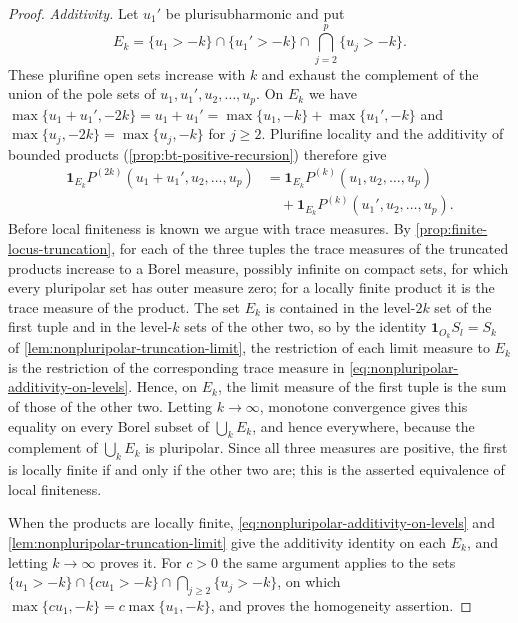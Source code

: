 \begin{proof}
\emph{Additivity.} Let $u_1'$ be plurisubharmonic and put
\[
 E_k=\{u_1>-k\}\cap\{u_1'>-k\}
                    \cap\bigcap_{j=2}^p\{u_j>-k\}.
\]
These plurifine open sets increase with $k$ and exhaust the complement of the union of the pole sets of $u_1,u_1',u_2,\ldots,u_p$. On $E_k$ we have $\max\{u_1+u_1',-2k\}=u_1+u_1'=\max\{u_1,-k\}+\max\{u_1',-k\}$ and $\max\{u_j,-2k\}=\max\{u_j,-k\}$ for $j\geq2$. Plurifine locality and the additivity of bounded products (\cref{prop:bt-positive-recursion}) therefore give
\begin{equation}\label{eq:nonpluripolar-additivity-on-levels}
 \begin{aligned}
 \mathbf1_{E_k}P^{(2k)}(u_1+u_1',u_2,\ldots,u_p)
 &=\mathbf1_{E_k}P^{(k)}(u_1,u_2,\ldots,u_p)\\
 &\quad+\mathbf1_{E_k}P^{(k)}(u_1',u_2,\ldots,u_p).
 \end{aligned}
\end{equation}
Before local finiteness is known we argue with trace measures. By \cref{prop:finite-locus-truncation}, for each of the three tuples the trace measures of the truncated products increase to a Borel measure, possibly infinite on compact sets, for which every pluripolar set has outer measure zero; for a locally finite product it is the trace measure of the product. The set $E_k$ is contained in the level-$2k$ set of the first tuple and in the level-$k$ sets of the other two, so by the identity $\mathbf1_{O_k}S_l=S_k$ of \cref{lem:nonpluripolar-truncation-limit}, the restriction of each limit measure to $E_k$ is the restriction of the corresponding trace measure in \eqref{eq:nonpluripolar-additivity-on-levels}. Hence, on $E_k$, the limit measure of the first tuple is the sum of those of the other two. Letting $k\to\infty$, monotone convergence gives this equality on every Borel subset of $\bigcup_kE_k$, and hence everywhere, because the complement of $\bigcup_kE_k$ is pluripolar. Since all three measures are positive, the first is locally finite if and only if the other two are; this is the asserted equivalence of local finiteness.

When the products are locally finite, \eqref{eq:nonpluripolar-additivity-on-levels} and \cref{lem:nonpluripolar-truncation-limit} give the additivity identity on each $E_k$, and letting $k\to\infty$ proves it. For $c>0$ the same argument applies to the sets $\{u_1>-k\}\cap\{cu_1>-k\}\cap\bigcap_{j\geq2}\{u_j>-k\}$, on which $\max\{cu_1,-k\}=c\max\{u_1,-k\}$, and proves the homogeneity assertion.
\end{proof}

